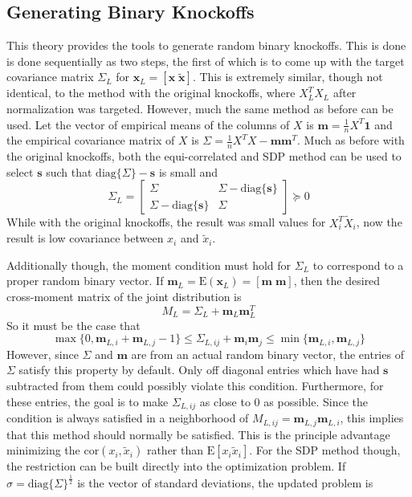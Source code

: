 \documentclass[11pt]{article}
\newcommand{\E}{\mathrm{E}}
\newcommand{\diag}[1]{\mathrm{diag}\{#1\}}
\theoremstyle{definition}
\begin{document}
\subsection{Generating Binary Knockoffs}
This theory provides the tools to generate random binary knockoffs. This is done is done sequentially as two steps, the first of which is to come up with the target covariance matrix $\Sigma_L$ for $\mathbf x_L = [\mathbf x\; \mathbf{\tilde x}]$. This is extremely similar, though not identical, to the method with the original knockoffs, where $X_L^TX_L$ after normalization was targeted. However, much the same method as before can be used. Let the vector of empirical means of the columns of $X$ is $\mathbf m = \frac{1}{n}X^T\mathbf 1$ and the empirical covariance matrix of $X$ is $\Sigma = \frac{1}{n}X^TX - \mathbf{m}\mathbf{m}^T$. Much as before with the original knockoffs, both the equi-correlated and SDP method can be used to select  $\mathbf s$  such that $\diag{\Sigma}-\mathbf s$ is small and 
        \[ \Sigma_L = \left[\begin{array}{cc}  \Sigma & \Sigma - \diag{\mathbf s }\\ \Sigma - \diag{\mathbf s} & \Sigma \end{array}\right] \succeq 0 \]
    While with the original knockoffs, the result was small values for $X_i^T\tilde X_i$, now the result is low covariance between $x_i$ and $\tilde x_i$.\par
    Additionally though, the moment condition must hold for $\Sigma_L$ to correspond to a proper random binary vector. If $\mathbf m_L = \E\left(\mathbf x_L\right) = [\mathbf m \; \mathbf m]$, then the desired cross-moment matrix of the joint distribution is 
        \[ M_L = \Sigma_L + \mathbf m_L\mathbf m_L^T\]
        So it must be the case that  
        \[\max\{0,\mathbf m_{L,i} + \mathbf m_{L,j} -1\} \leq \Sigma_{L,ij} + \mathbf m_i \mathbf m_j \leq \min\{\mathbf m_{L,i}, \mathbf m_{L,j}\} \]
        However, since $\Sigma$ and $\mathbf m$ are from an actual random binary vector, the entries of $\Sigma$ satisfy this property by default. Only off diagonal entries which have had $\mathbf s$ subtracted from them could possibly violate this condition. Furthermore, for these entries, the goal is to make $\Sigma_{L,ij}$ as close to $0$ as possible. Since the condition is always satisfied in a neighborhood of $M_{L,ij} = \mathbf m_{L,j}\mathbf m_{L,i}$, this implies that this method should normally be satisfied. This is the principle advantage minimizing the $\textrm{cor}(x_i,\tilde x_i)$ rather than $\E[x_i\tilde x_i]$. For the SDP method though, the restriction can be built directly into the optimization problem. If $\sigma = \diag{\Sigma}^{\frac{1}{2}}$ is the vector of standard deviations, the updated problem is
\end{document}
